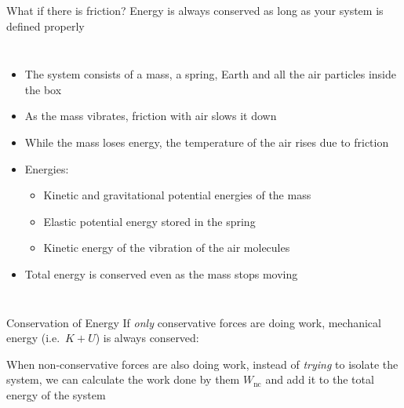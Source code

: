 \documentclass[12pt,compress,aspectratio=169]{beamer}
\newcommand{\eq}[2]{\vspace{#1}{\Large\begin{displaymath}#2\end{displaymath}}}
\begin{document}
\begin{frame}{What if there is friction?}
  Energy is always conserved as long as your system is defined properly
  \begin{columns}
    \begin{itemize}
    \item The system consists of a mass, a spring, Earth and all the air
      particles inside the box
    \item As the mass vibrates, friction with air slows it down
    \item While the mass loses energy, the temperature of the air rises due to
      friction
    \item Energies:
      \begin{itemize}
      \item Kinetic and gravitational potential energies of the mass
      \item Elastic potential energy stored in the spring
      \item Kinetic energy of the vibration of the air molecules
      \end{itemize}
    \item Total energy is conserved even as the mass stops moving
    \end{itemize}
  \end{columns}
\end{frame}



\begin{frame}{Conservation of Energy}
  If \emph{only} conservative forces are doing work, mechanical energy (i.e.\
  $K+U$) is always conserved:

  \eq{-.2in}{
    \boxed{K +U =K'+U'}
  }
  
  When non-conservative forces are also doing work, instead of
  \emph{trying} to isolate the system, we can calculate the work done by them
  $W_{\textrm{nc}}$ and add it to the total energy of the system
    
  \eq{-.2in}{
    \boxed{K+U+W_{\textrm{nc}}=K'+U'}
  }
\end{frame}
\end{document}
